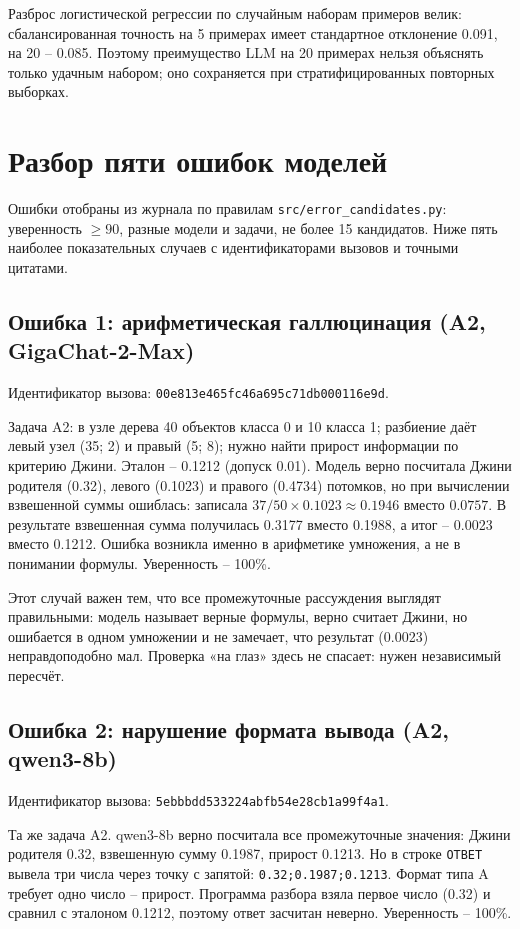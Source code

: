 \documentclass{bmstu}
\begin{document}
Разброс логистической регрессии по случайным наборам примеров велик: сбалансированная точность на 5 примерах имеет стандартное отклонение 0.091, на 20 -- 0.085. Поэтому преимущество LLM на 20 примерах нельзя объяснять только удачным набором; оно сохраняется при стратифицированных повторных выборках.

\chapter{Разбор пяти ошибок моделей}
\label{ch:errors}

Ошибки отобраны из журнала по правилам \texttt{src/error\_candidates.py}: уверенность $\ge90$, разные модели и задачи, не более 15 кандидатов. Ниже пять наиболее показательных случаев с идентификаторами вызовов и точными цитатами.

\section{Ошибка 1: арифметическая галлюцинация (A2, GigaChat-2-Max)}
Идентификатор вызова: \texttt{00e813e465fc46a695c71db000116e9d}.

Задача A2: в узле дерева 40 объектов класса 0 и 10 класса 1; разбиение даёт левый узел (35; 2) и правый (5; 8); нужно найти прирост информации по критерию Джини. Эталон -- 0.1212 (допуск 0.01). Модель верно посчитала Джини родителя (0.32), левого (0.1023) и правого (0.4734) потомков, но при вычислении взвешенной суммы ошиблась: записала $37/50 \times 0.1023 \approx 0.1946$ вместо $0.0757$. В результате взвешенная сумма получилась 0.3177 вместо 0.1988, а итог -- 0.0023 вместо 0.1212. Ошибка возникла именно в арифметике умножения, а не в понимании формулы. Уверенность -- 100\%.

Этот случай важен тем, что все промежуточные рассуждения выглядят правильными: модель называет верные формулы, верно считает Джини, но ошибается в одном умножении и не замечает, что результат (0.0023) неправдоподобно мал. Проверка «на глаз» здесь не спасает: нужен независимый пересчёт.

\section{Ошибка 2: нарушение формата вывода (A2, qwen3-8b)}
Идентификатор вызова: \texttt{5ebbbdd533224abfb54e28cb1a99f4a1}.

Та же задача A2. qwen3-8b верно посчитала все промежуточные значения: Джини родителя 0.32, взвешенную сумму 0.1987, прирост 0.1213. Но в строке \texttt{ОТВЕТ} вывела три числа через точку с запятой: \texttt{0.32;0.1987;0.1213}. Формат типа A требует одно число -- прирост. Программа разбора взяла первое число (0.32) и сравнил с эталоном 0.1212, поэтому ответ засчитан неверно. Уверенность -- 100\%.
\end{document}
